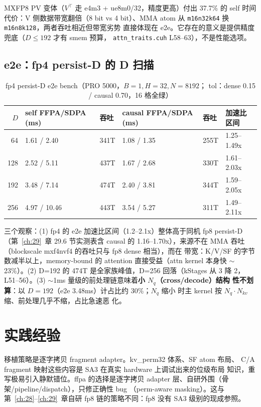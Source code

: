 MXFP8 PV 变体（$V^\top$ 走 e4m3 + ue8m0/32，精度更高）付出 37.7\%
的 self 时间代价：V 侧数据带宽翻倍（8 bit vs 4 bit）、MMA atom 从
\texttt{m16n32k64} 换 \texttt{m16n8k128}，两者吞吐相近但带宽劣势
直接体现在 e2e。它存在的意义是提供精度兜底（$D\le192$ 才有 smem 预算，
\texttt{attn\_traits.cuh} L58--63），不是性能选项。

\subsection{e2e：fp4 persist-D 的 D 扫描}

\begin{table}[H]
  \centering
  \caption{fp4 persist-D e2e bench（PRO 5000，$B{=}1,H{=}32,N{=}8192$；
  tol：dense 0.15 / causal 0.70，16 格全绿）}
  \label{tab:31-bench}
  \begin{tabular}{@{}rlllll@{}}
    \toprule
    $D$ & self FFPA/SDPA (ms) & 吞吐 & causal FFPA/SDPA (ms) & 吞吐 & 加速比区间 \\
    \midrule
    64  & 1.61 / 2.40 & 341T & 1.08 / 1.35 & 255T & 1.25--1.49x \\
    128 & 2.52 / 5.11 & 437T & 1.67 / 2.68 & 330T & 1.61--2.03x \\
    192 & 3.48 / 7.14 & 474T & 2.40 / 3.81 & 344T & 1.59--2.05x \\
    256 & 4.97 / 10.46 & 443T & 3.54 / 5.27 & 311T & 1.49--2.11x \\
    \bottomrule
  \end{tabular}
\end{table}

三个观察：(1) fp4 的 e2e 加速比区间（1.2--2.1x）整体高于同机 fp8
persist-D（第~\ref{ch:29}~章 29.6 节实测表含 causal 的 1.16--1.70x），来源不在 MMA
吞吐（blockscale mxf4nvf4 的吞吐只与 fp8 dense 相当），而在
带宽：K/V/SF 的字节数减半以上，memory-bound 的 attention
直接受益（attn kernel 本身快 $\sim$23\%）。(2) D=192 的
474T 是全家族峰值，D=256 回落（kStages 从 3 降 2，L51--56）。(3)
$\sim$1ms 量级的前处理链意味着\textbf{小 $N_q$（cross/decode）结构
性不划算}：以 $D{=}192$（e2e 3.48ms）计占比约 30\%；$N_q$ 缩小
时主 kernel 按 $N_q\cdot N_{kv}$ 缩、前处理几乎不缩，占比急速恶
化。

\section{实践经验}

移植策略是逐字拷贝 fragment adapter。kv\_perm32 体系、SF atom 布局、
C/A fragment 映射这些内容是 SA3 在真实 hardware 上调试出来的位级布局
知识，重写极易引入静默错位。ffpa 的选择是逐字拷贝
adapter 层、自研外围（骨架/pipeline/dispatch），只修正确性 bug
（perm-aware masking）。这与第~\ref{ch:28}--\ref{ch:29}~章自研 fp8
链的策略不同：fp8 没有 SA3 级别的现成参照。

